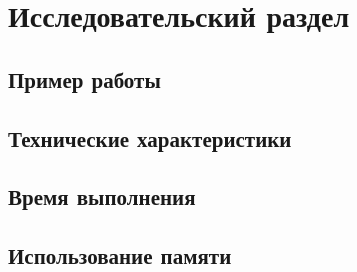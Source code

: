 \chapter{Исследовательский раздел}
\label{cha:research}

\section{Пример работы}

\section{Технические характеристики}

\section{Время выполнения}

\section{Использование памяти}

